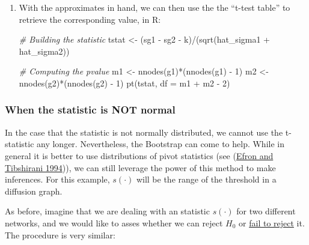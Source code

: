 \documentclass[
]{book}
\newenvironment{Shaded}{\begin{snugshade}}{\end{snugshade}}
\newcommand{\AttributeTok}[1]{\textcolor[rgb]{0.77,0.63,0.00}{#1}}
\newcommand{\CommentTok}[1]{\textcolor[rgb]{0.56,0.35,0.01}{\textit{#1}}}
\newcommand{\DecValTok}[1]{\textcolor[rgb]{0.00,0.00,0.81}{#1}}
\newcommand{\FunctionTok}[1]{\textcolor[rgb]{0.00,0.00,0.00}{#1}}
\newcommand{\NormalTok}[1]{#1}
\newcommand{\OtherTok}[1]{\textcolor[rgb]{0.56,0.35,0.01}{#1}}
\newcommand{\SpecialCharTok}[1]{\textcolor[rgb]{0.00,0.00,0.00}{#1}}
\begin{document}
\begin{enumerate}
\begin{Shaded}
\end{Shaded}
\item
  With the approximates in hand, we can then use the the ``t-test table'' to
  retrieve the corresponding value, in R:

\begin{Shaded}
\begin{Highlighting}[]
\CommentTok{\# Building the statistic}
\NormalTok{tstat }\OtherTok{\textless{}{-}}\NormalTok{ (sg1 }\SpecialCharTok{{-}}\NormalTok{ sg2 }\SpecialCharTok{{-}}\NormalTok{ k)}\SpecialCharTok{/}\NormalTok{(}\FunctionTok{sqrt}\NormalTok{(hat\_sigma1 }\SpecialCharTok{+}\NormalTok{ hat\_sigma2))}

\CommentTok{\# Computing the pvalue}
\NormalTok{m1 }\OtherTok{\textless{}{-}} \FunctionTok{nnodes}\NormalTok{(g1)}\SpecialCharTok{*}\NormalTok{(}\FunctionTok{nnodes}\NormalTok{(g1) }\SpecialCharTok{{-}} \DecValTok{1}\NormalTok{)}
\NormalTok{m2 }\OtherTok{\textless{}{-}} \FunctionTok{nnodes}\NormalTok{(g2)}\SpecialCharTok{*}\NormalTok{(}\FunctionTok{nnodes}\NormalTok{(g2) }\SpecialCharTok{{-}} \DecValTok{1}\NormalTok{)}
\FunctionTok{pt}\NormalTok{(tstat, }\AttributeTok{df =}\NormalTok{ m1 }\SpecialCharTok{+}\NormalTok{ m2 }\SpecialCharTok{{-}} \DecValTok{2}\NormalTok{)}
\end{Highlighting}
\end{Shaded}
\end{enumerate}

\hypertarget{when-the-statistic-is-not-normal}{%
\subsubsection{When the statistic is NOT normal}\label{when-the-statistic-is-not-normal}}

In the case that the statistic is not normally distributed, we cannot use the
t-statistic any longer. Nevertheless, the Bootstrap can come to help. While
in general it is better to use distributions of pivot statistics (see (\protect\hyperlink{ref-Efron1994}{Efron and Tibshirani 1994})),
we can still leverage the power of this method to make inferences. For this
example, \(s(\cdot)\) will be the range of the threshold in a diffusion graph.

As before, imagine that we are dealing with an statistic \(s(\cdot)\) for two
different networks, and we would like to asses whether we can reject \(H_0\)
or \href{https://www.thoughtco.com/fail-to-reject-in-a-hypothesis-test-3126424}{fail to reject} it.
The procedure is very similar:
\end{document}
